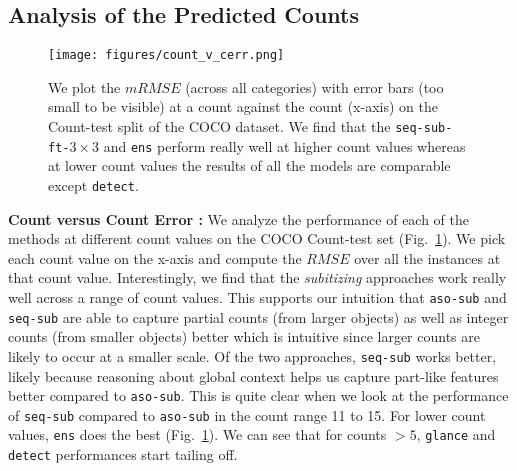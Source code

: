 \documentclass[10pt,twocolumn,letterpaper]{article}
\newcommand{\detect}{\texttt{detect}\xspace}
\newcommand{\sub}{\texttt{aso-sub}\xspace}
\newcommand{\seq}{\texttt{seq-sub}\xspace}
\newcommand{\glance}{\texttt{glance}\xspace}
\newcommand{\ens}{\texttt{ens}\xspace}
\begin{document}
\subsection{Analysis of the Predicted Counts} 
\begin{figure}[t]
\centering     \texttt{[image: figures/count\_v\_cerr.png]}
\vspace{-20pt}
\caption{\footnotesize{We plot the $mRMSE$ (across all categories) with error bars (too small to be visible) at a count against the count (x-axis) on the Count-test split of the COCO dataset. We find that the \seq{}\texttt{-ft-$3\times3$} and \ens perform really well at higher count values whereas at lower count values the results of all the models are comparable except \detect.}}
\label{fig:a}
\vspace{-18pt}
\end{figure}
\par \noindent
\textbf{Count versus Count Error : } We analyze the performance of each of the methods at different count values on the COCO Count-test set (Fig.~\ref{fig:a}). 
We pick each count value on the x-axis and compute the $RMSE$ over all the instances at that count value. Interestingly, we find that the \emph{subitizing} approaches work really well across a range of count values. This supports our intuition that \sub and \seq are able to capture partial counts (from larger objects) as well as integer counts (from smaller objects) better which is intuitive since larger counts are likely to occur at a smaller scale. Of the two approaches, \seq works better, likely because reasoning about global context helps us capture part-like features better compared to \sub. This is quite clear when we look at the performance of \seq compared to \sub in the count range 11 to 15. For lower count values, \ens does the best (Fig.~\ref{fig:a}). We can see that for counts $>5$, \glance and \detect performances start tailing off. 







\begin{comment}

\begin{figure}[t]
\texttt{[image: figures/detection\_qualitative]}
\caption{We show the ground truth count (first col.), outputs of \detect{} with a default threshold of 0.8 (second col.), and outputs of \detect{} with hyperparameters tuned for counting (third col.). We can see that choosing a different threshold allows us to trade-off localization accuracy for counting accuracy (see bottle image). Thus, the method finds partial evidence for counts, even if it cannot localize the full object.}
\label{fig:qual_det}
\vspace{-10pt}
\end{figure}

\end{comment}
\end{document}
